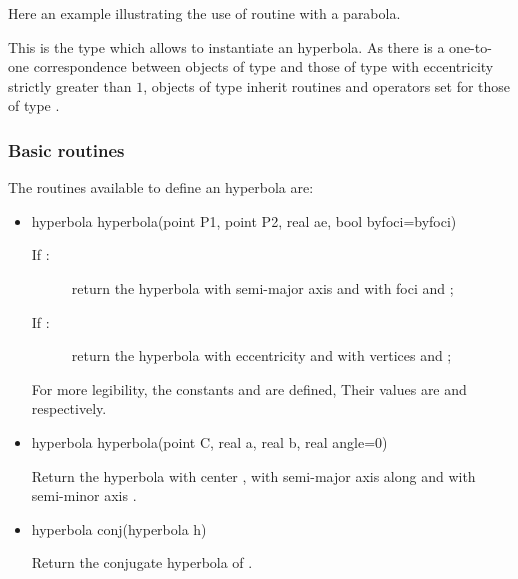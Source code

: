 \documentclass[pdftex]{article}
\begin{document}
\begin{itemize}
  Here an example illustrating the use of routine
   with a parabola.
\end{itemize}

This is the type  which allows to instantiate an
hyperbola.
As there is a one-to-one correspondence between objects of type
 and those of type  with eccentricity
strictly greater than $1$, objects of type  inherit routines and operators
set for those of type .
\subsubsection{Basic routines}
The routines available to define an hyperbola are:
\begin{itemize}
\item {}
  \begin{Vcolor}
    hyperbola hyperbola(point P1, point P2, real ae, bool byfoci=byfoci)
  \end{Vcolor}
  \begin{description}
  \item[If :] return the hyperbola with semi-major axis
     and with foci  and ;
  \item[If :] return the hyperbola with
    eccentricity  and with vertices  and ;
  \end{description}
  For more legibility, the constants 
  and  are defined, Their values
  are  and  respectively.
\item {}
  \begin{Vcolor}
    hyperbola hyperbola(point C, real a, real b, real angle=0)
  \end{Vcolor}
  Return the hyperbola with center , with semi-major axis 
  along  and with semi-minor axis .
\item {}
  \begin{Vcolor}
    hyperbola conj(hyperbola h)
  \end{Vcolor}
  Return the conjugate hyperbola of .
\end{itemize}
\end{document}
